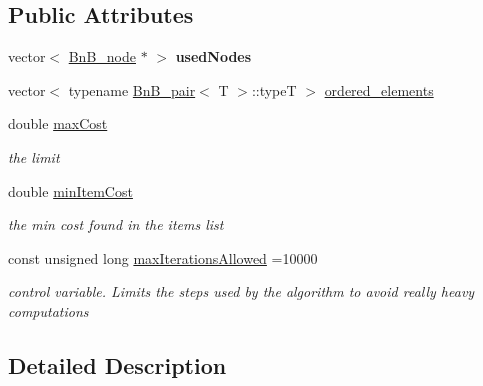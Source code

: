 \subsection*{Public Attributes}
\begin{DoxyCompactItemize}
\item 
\hypertarget{class_bn_b___u_p_ab8a6d7f562cea7911112b6b7dfd559c6}{}vector$<$ \hyperlink{class_bn_b__node}{Bn\+B\+\_\+node} $\ast$ $>$ {\bfseries used\+Nodes}\label{class_bn_b___u_p_ab8a6d7f562cea7911112b6b7dfd559c6}

\item 
vector$<$ typename \hyperlink{struct_bn_b__pair}{Bn\+B\+\_\+pair}$<$ T $>$\+::type\+T $>$ \hyperlink{class_bn_b___u_p_a8308ba99698255a402675713b1ac6cb0}{ordered\+\_\+elements}
\item 
\hypertarget{class_bn_b___u_p_a0749a907c11c880f825fd0644a8a2bfd}{}double \hyperlink{class_bn_b___u_p_a0749a907c11c880f825fd0644a8a2bfd}{max\+Cost}\label{class_bn_b___u_p_a0749a907c11c880f825fd0644a8a2bfd}

\begin{DoxyCompactList}\small\item\em the limit \end{DoxyCompactList}\item 
\hypertarget{class_bn_b___u_p_ae5fdb19ab49f1e0dc93700a42c5884f9}{}double \hyperlink{class_bn_b___u_p_ae5fdb19ab49f1e0dc93700a42c5884f9}{min\+Item\+Cost}\label{class_bn_b___u_p_ae5fdb19ab49f1e0dc93700a42c5884f9}

\begin{DoxyCompactList}\small\item\em the min cost found in the items list \end{DoxyCompactList}\item 
\hypertarget{class_bn_b___u_p_a05b18af61820e672cff387958b393949}{}const unsigned long \hyperlink{class_bn_b___u_p_a05b18af61820e672cff387958b393949}{max\+Iterations\+Allowed} =10000\label{class_bn_b___u_p_a05b18af61820e672cff387958b393949}

\begin{DoxyCompactList}\small\item\em control variable. Limits the steps used by the algorithm to avoid really heavy computations \end{DoxyCompactList}\end{DoxyCompactItemize}


\subsection{Detailed Description}
